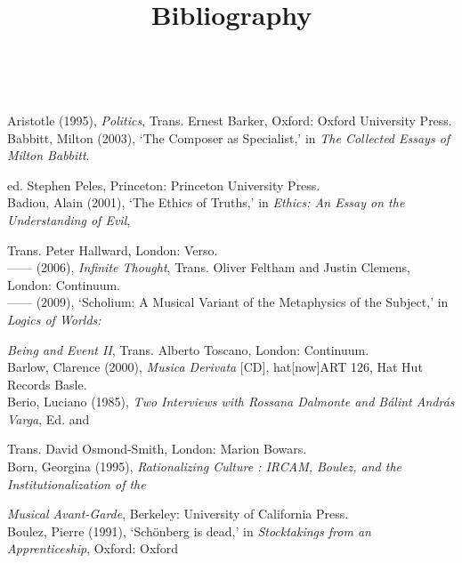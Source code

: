 \paragraph{}
\paragraph{}
\begin{flushleft}
\huge 
\marginpar{}
\title{\textbf{Bibliography}} \\
\end{flushleft}
\vspace{20pt} 
\normalsize
Aristotle (1995), \emph{Politics}, Trans. Ernest Barker, Oxford: Oxford University Press.\\
Babbitt, Milton (2003), `The Composer as Specialist,' in \emph{The Collected Essays of Milton Babbitt}.  

ed. Stephen Peles,  Princeton: Princeton University Press.\\
Badiou, Alain (2001), `The Ethics of Truths,' in \emph{Ethics: An Essay on the Understanding of Evil}, 

Trans. Peter Hallward, London: Verso.\\
------ (2006), \emph{Infinite Thought}, Trans. Oliver Feltham and Justin Clemens, London: Continuum.\\
------ (2009), `Scholium: A Musical Variant of the Metaphysics of the Subject,' in \emph{Logics of Worlds:}

\emph{Being and Event II}, Trans. Alberto Toscano, London: Continuum.\\
Barlow, Clarence (2000), \emph{Musica Derivata} [CD], hat[now]ART 126, Hat Hut Records Basle.\\
Berio, Luciano (1985), \emph{Two Interviews with Rossana Dalmonte and B\'{a}lint Andr\'{a}s Varga},  Ed. and 

Trans. David Osmond-Smith, London: Marion Bowars.\\
Born, Georgina (1995), \emph{Rationalizing Culture : IRCAM, Boulez, and the Institutionalization of the}

\emph{Musical Avant-Garde}, Berkeley: University of California Press.\\
Boulez, Pierre (1991), `Sch\"{o}nberg is dead,' in \emph{Stocktakings from an Apprenticeship}, Oxford: Oxford 

